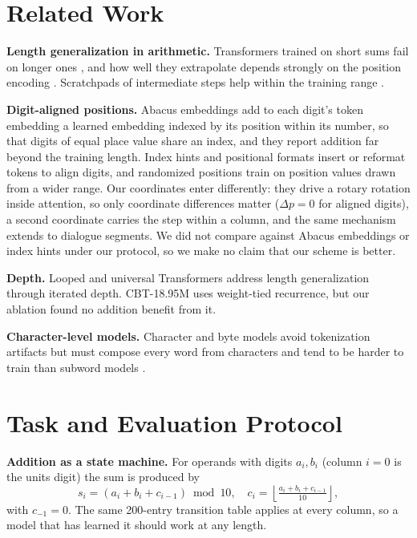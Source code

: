 \documentclass[10pt,twocolumn]{article}
\begin{document}
\section{Related Work}\label{sec:related}

\textbf{Length generalization in arithmetic.} Transformers trained on short sums fail on longer ones \cite{nogueira2021investigating,jelassi2023length,dziri2023faith}, and how well they extrapolate depends strongly on the position encoding \cite{kazemnejad2023impact}. Scratchpads of intermediate steps help within the training range \cite{nye2021show,wei2022chainofthought}.

\textbf{Digit-aligned positions.} Abacus embeddings \cite{mcleish2024transformers} add to each digit's token embedding a learned embedding indexed by its position within its number, so that digits of equal place value share an index, and they report addition far beyond the training length. Index hints and positional formats \cite{zhou2024transformers,shen2023positional,duan2023interpolation} insert or reformat tokens to align digits, and randomized positions \cite{ruoss2023randomized} train on position values drawn from a wider range. Our coordinates enter differently: they drive a rotary rotation inside attention, so only coordinate differences matter ($\Delta p = 0$ for aligned digits), a second coordinate carries the step within a column, and the same mechanism extends to dialogue segments. We did not compare against Abacus embeddings or index hints under our protocol, so we make no claim that our scheme is better.

\textbf{Depth.} Looped and universal Transformers \cite{dehghani2019universal,giannou2023looped,fan2024looped} address length generalization through iterated depth. CBT-18.95M uses weight-tied recurrence, but our ablation found no addition benefit from it.

\textbf{Character-level models.} Character and byte models avoid tokenization artifacts but must compose every word from characters and tend to be harder to train than subword models \cite{alrfou2019character,libovicky2022why,mielke2021between,xue2022byt5,clark2022canine,pagnoni2024byte,shaham2021neural}.


\section{Task and Evaluation Protocol}\label{sec:setup}

\textbf{Addition as a state machine.} For operands with digits $a_i, b_i$ (column $i=0$ is the units digit) the sum is produced by
\begin{equation}
s_i = (a_i + b_i + c_{i-1}) \bmod 10,\quad c_i = \left\lfloor \tfrac{a_i + b_i + c_{i-1}}{10} \right\rfloor,
\end{equation}
with $c_{-1}=0$. The same 200-entry transition table applies at every column, so a model that has learned it should work at any length.
\end{document}
